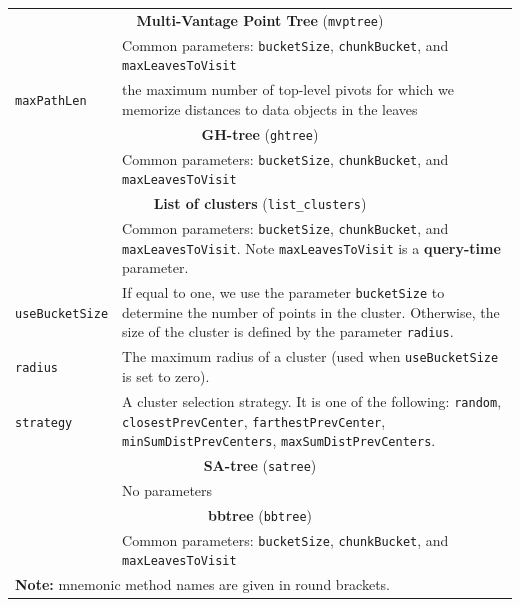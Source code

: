 \documentclass[runningheads,a4paper]{llncs}
\newcommand{\ttt}[1]{\texttt{#1}}
\begin{document}
{\begin{table}
\begin{tabular}{l@{\hspace{2mm}}p{3.5in}}
\cmidrule(l){1-2} 
\multicolumn{2}{c}{\textbf{Multi-Vantage Point Tree} (\ttt{mvptree})  \cite{bozkaya1999indexing}}   \\
\cmidrule(l){1-2} 
                   & Common parameters: \ttt{bucketSize}, \ttt{chunkBucket}, and \ttt{maxLeavesToVisit} \\
 \ttt{maxPathLen}  & the maximum number of top-level pivots for which we memorize distances
to data objects in the leaves \\
\cmidrule(l){1-2} 
\multicolumn{2}{c}{\textbf{GH-tree} (\ttt{ghtree})  \cite{Uhlmann:1991}}   \\
\cmidrule(l){1-2} 
                   & Common parameters: \ttt{bucketSize}, \ttt{chunkBucket}, and \ttt{maxLeavesToVisit} \\
\cmidrule(l){1-2} 
\multicolumn{2}{c}{\textbf{List of clusters} (\ttt{list\_clusters})  \cite{chavez2005compact}}   \\
\cmidrule(l){1-2} 
                   & Common parameters: \ttt{bucketSize}, \ttt{chunkBucket}, and \ttt{maxLeavesToVisit}. Note \ttt{maxLeavesToVisit} is a \textbf{query-time} parameter. \\
\ttt{useBucketSize} & If equal to one, we use the parameter \ttt{bucketSize} to determine the number of points in the cluster. Otherwise, the size of the cluster is defined by the parameter \ttt{radius}. \\
\ttt{radius}        & The maximum radius of a cluster (used when \ttt{useBucketSize} is set to zero). \\
\ttt{strategy}      & A cluster selection strategy. It is one of the following: \ttt{random}, \ttt{closestPrevCenter}, \ttt{farthestPrevCenter}, \ttt{minSumDistPrevCenters}, \ttt{maxSumDistPrevCenters}. \\ 
\cmidrule(l){1-2} 
\multicolumn{2}{c}{\textbf{SA-tree} (\ttt{satree})  \cite{navarro2002searching}}   \\
\cmidrule(l){1-2} 
                   & No parameters \\
\cmidrule(l){1-2} 
\multicolumn{2}{c}{\textbf{bbtree} (\ttt{bbtree})  \cite{Cayton2008}}   \\
\cmidrule(l){1-2} 
                   & Common parameters: \ttt{bucketSize}, \ttt{chunkBucket}, and \ttt{maxLeavesToVisit} \\
\bottomrule
\multicolumn{2}{l}{\textbf{Note:} mnemonic method names are given in round brackets.}
\end{tabular}
\vspace{2em}
\end{table}

}
\end{document}
